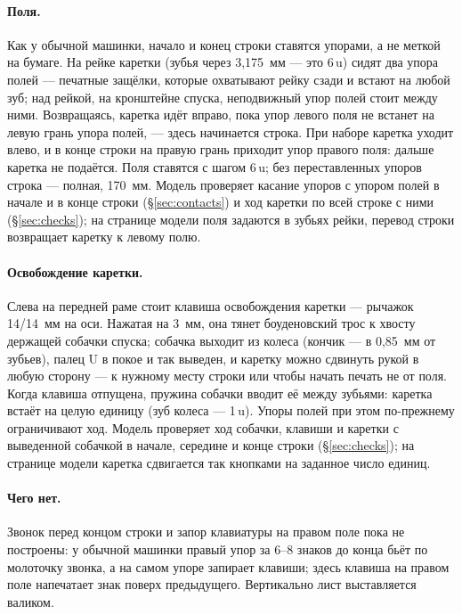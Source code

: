 \paragraph{Поля.} Как у обычной машинки, начало и конец строки ставятся упорами, а не меткой на бумаге. На рейке каретки (зубья через 3,175~мм — это 6\,u) сидят два упора полей — печатные защёлки, которые охватывают рейку сзади и встают на любой зуб; над рейкой, на кронштейне спуска, неподвижный упор полей стоит между ними. Возвращаясь, каретка идёт вправо, пока упор левого поля не встанет на левую грань упора полей, — здесь начинается строка. При наборе каретка уходит влево, и в конце строки на правую грань приходит упор правого поля: дальше каретка не подаётся. Поля ставятся с шагом 6\,u; без переставленных упоров строка — полная, 170~мм. Модель проверяет касание упоров с упором полей в начале и в конце строки (\S\ref{sec:contacts}) и ход каретки по всей строке с ними (\S\ref{sec:checks}); на странице модели поля задаются в зубьях рейки, перевод строки возвращает каретку к левому полю. \paragraph{Освобождение каретки.} Слева на передней раме стоит клавиша освобождения каретки — рычажок 14/14~мм на оси. Нажатая на 3~мм, она тянет боуденовский трос к хвосту держащей собачки спуска; собачка выходит из колеса (кончик — в 0,85~мм от зубьев), палец U в покое и так выведен, и каретку можно сдвинуть рукой в любую сторону — к нужному месту строки или чтобы начать печать не от поля. Когда клавиша отпущена, пружина собачки вводит её между зубьями: каретка встаёт на целую единицу (зуб колеса — 1\,u). Упоры полей при этом по-прежнему ограничивают ход. Модель проверяет ход собачки, клавиши и каретки с выведенной собачкой в начале, середине и конце строки (\S\ref{sec:checks}); на странице модели каретка сдвигается так кнопками на заданное число единиц.

\paragraph{Чего нет.} Звонок перед концом строки и запор клавиатуры на правом поле пока не построены: у обычной машинки правый упор за 6--8 знаков до конца бьёт по молоточку звонка, а на самом упоре запирает клавиши; здесь клавиша на правом поле напечатает знак поверх предыдущего. Вертикально лист выставляется валиком.

